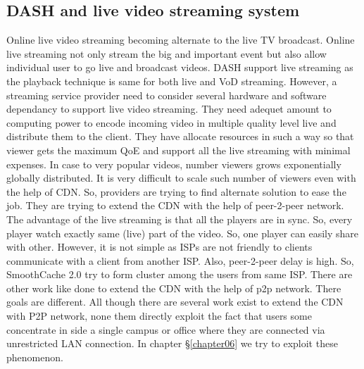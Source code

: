 \subsection{DASH and live video streaming system}
Online live video streaming becoming alternate to the live TV broadcast. Online live streaming not only stream the big and important event but also allow individual user to go live and broadcast videos. DASH support live streaming as the playback technique is same for both live and VoD streaming. However, a streaming service provider need to consider several hardware and software dependancy to support live video streaming. They need adequet amount to computing power to encode incoming video in multiple quality level live and distribute them to the client. They have allocate resources in such a way so that viewer gets the maximum QoE and support all the live streaming with minimal expenses. In case to very popular videos, number viewers grows exponentially globally distributed. It is very difficult to scale such number of viewers even with the help of CDN. So, providers are trying to find alternate solution to ease the job. They are trying to extend the CDN with the help of peer-2-peer network. The advantage of the live streaming is that all the players are in sync. So, every player watch exactly same (live) part of the video. So, one player can easily share with other. However, it is not simple as ISPs are not friendly to clients communicate with a client from another ISP. Also, peer-2-peer delay is high. So, SmoothCache 2.0 try to form cluster among the users from same ISP. There are other work like \cite{10.1145/3387514.3405856,9155467,8057140} done to extend the CDN with the help of p2p network. There goals are different. All though there are several work exist to extend the CDN with P2P network, none them directly exploit the fact that users some concentrate in side a single campus or office where they are connected via unrestricted LAN connection. In chapter \S\ref{chapter06} we try to exploit these phenomenon.